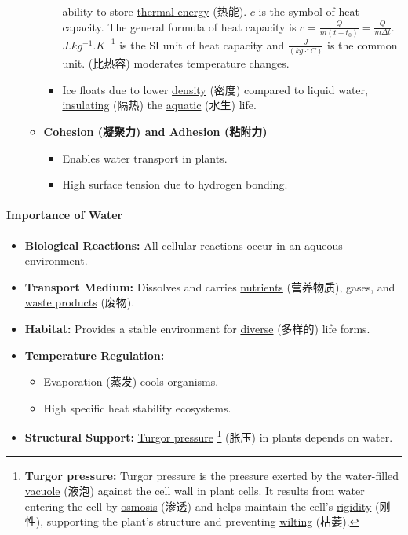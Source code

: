 \begin{itemize}
\begin{itemize}
\begin{itemize}
{            ability to store \underline{thermal energy} (热能). $c$ is the symbol of heat capacity. The general formula of heat
            capacity is $c = \frac{Q}{m \left(t - t_0\right)} = \frac{Q}{m \Delta t}$. $\unit{J.kg^{-1}.K^{-1}}$ is the SI unit
            of heat capacity and $\frac{J}{(kg \cdot ^{\circ} C)}$ is the common unit.} (比热容) moderates temperature changes.
            \item Ice floats due to lower \underline{density} (密度) compared to liquid water, \underline{insulating} (隔热) the
            \underline{aquatic} (水生) life.
        \end{itemize}
        \item \textbf{\underline{Cohesion} (凝聚力) and \underline{Adhesion} (粘附力)}
        \begin{itemize}
            \item Enables water transport in plants.
            \item High surface tension due to hydrogen bonding.
        \end{itemize}
    \end{itemize}
\end{itemize}

\paragraph{Importance of Water}
\begin{itemize}
    \item \textbf{Biological Reactions:} All cellular reactions occur in an aqueous environment.
    \item \textbf{Transport Medium:} Dissolves and carries \underline{nutrients} (营养物质), gases, and \underline{waste products}
    (废物).
    \item \textbf{Habitat:} Provides a stable environment for \underline{diverse} (多样的) life forms.
    \item \textbf{Temperature Regulation:}
    \begin{itemize}
        \item \underline{Evaporation} (蒸发) cools organisms.
        \item High specific heat stability ecosystems.
    \end{itemize}
    \item \textbf{Structural Support:} \underline{Turgor pressure} \footnote{\textbf{Turgor pressure:} Turgor pressure is the
    pressure exerted by the water-filled \underline{vacuole} (液泡) against the cell wall in plant cells. It results from water
    entering the cell by \underline{osmosis} (渗透) and helps maintain the cell's \underline{rigidity} (刚性), supporting the
    plant's structure and preventing \underline{wilting} (枯萎).} (胀压) in plants depends on water.
\end{itemize}

